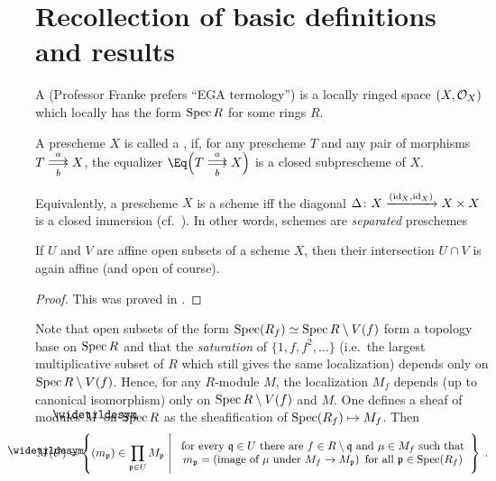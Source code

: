 \documentclass[a4paper,parskip=half,numbers=enddot, DIV=12]{scrreprt}
\begin{document}
\section{Recollection of basic definitions and results}
\begin{defi}
	\begin{alphanumerate}
		\item A  (Professor Franke prefers ``EGA termology'') is a locally ringed space $(X,\mathcal{O}_X)$ which locally has the form $\operatorname{Spec} R$ for some rings $R$.
		\item A prescheme $X$ is called a , if, for any prescheme $T$ and any pair of morphisms $T\doublemorphism[a][b]X$, the equalizer $\Eq\Big(T\doublemorphism[a][b]X\Big)$ is a closed subprescheme of $X$.
	\end{alphanumerate}
\end{defi}
\begin{rem*}
	Equivalently, a prescheme $X$ is a scheme iff the diagonal $\Delta\colon X\xrightarrow{(\operatorname{id}_X,\operatorname{id}_X)}X\times X$ is a closed immersion (cf.\ \cite[Fact~1.5.8]{alggeo1}). In other words, schemes are \emph{separated} preschemes
\end{rem*}
\begin{prop}
	If $U$ and $V$ are affine open subsets of a scheme $X$, then their intersection $U\cap V$ is again affine (and open of course).
\end{prop}
\begin{proof}
	This was proved in \cite[Proposition~1.5.4]{alggeo1}.
\end{proof}
	Note that open subsets of the form $\operatorname{Spec}(R_f)\simeq \operatorname{Spec} R\setminus V(f)$ form a topology base on $\operatorname{Spec} R$ and that the \emph{saturation} of $\{1,f,f^2,\ldots\}$ (i.e.\ the largest multiplicative subset of $R$ which still gives the same localization) depends only on $\operatorname{Spec} R\setminus V(f)$. Hence, for any $R$-module $M$, the localization $M_f$ depends (up to canonical isomorphism) only on $\operatorname{Spec} R\setminus V(f)$ and $M$. One defines a sheaf of modules $\snake{M}$ on $\operatorname{Spec} R$ as the sheafification of $\operatorname{Spec} (R_f)\mapsto M_f$. Then
	\begin{align*}
		\snake{M}(U)=\left\{(m_\pp)\in\prod_{\pp\in U}M_\pp\st
		\begin{array}{c}
			\text{for every }\qq\in U\text{ there are }f\in R\setminus\qq\text{ and }\mu\in M_f\text{ such that}\\
			m_\pp=\left(\text{image of }\mu\text{ under }M_f\morphism M_\pp\right)\text{ for all }\pp\in\Spec (R_f)
		\end{array}
		\right\}\;.
	\end{align*}
\end{document}

